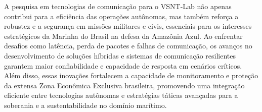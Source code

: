 A pesquisa em tecnologias de comunicação para o VSNT-Lab não apenas contribui para a eficiência das operações autônomas, mas também reforça a robustez e a segurança em missões militares e civis, essenciais para os interesses estratégicos da Marinha do Brasil na defesa da Amazônia Azul. Ao enfrentar desafios como latência, perda de pacotes e falhas de comunicação, os avanços no desenvolvimento de soluções híbridas e sistemas de comunicação resilientes garantem maior confiabilidade e capacidade de resposta em cenários críticos. Além disso, essas inovações fortalecem a capacidade de monitoramento e proteção da extensa Zona Econômica Exclusiva brasileira, promovendo uma integração eficiente entre tecnologias autônomas e estratégias táticas avançadas para a soberania e a sustentabilidade no domínio marítimo.